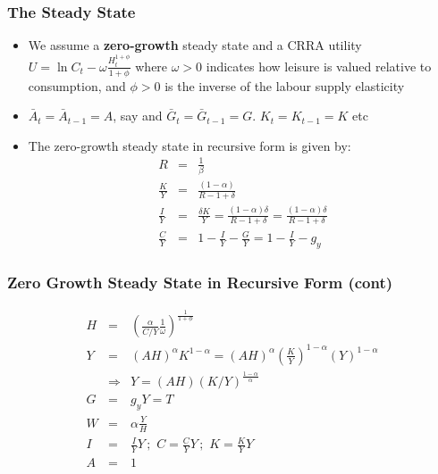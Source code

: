 \documentclass[xcolor=dvipsnames,handout,aspectratio=169]{beamer}
\begin{document}
\begin{frame}
 \frametitle{\textbf{The Steady State}}
 \begin{itemize}
\item We assume a  \textbf{zero-growth} steady state and a CRRA utility $U = \ln C_t - \omega\frac{H_t^{1+\phi}}{1+\phi}$
where $\omega> 0$ indicates how leisure is valued relative to consumption,
and $\phi> 0$ is the inverse of the labour supply elasticity
\item  $\bar{A}_t=\bar{A}_{t-1}=A$, say and $\bar{G}_t=\bar{G}_{t-1}=G$. $K_t=K_{t-1}=K$  etc
\item  The zero-growth  steady state in recursive form is given by:
\begin{eqnarray*}
R&=&\frac{1}{\beta}\\
\label{KY} \frac{K}{Y}&=&\frac{ (1-\alpha)}{R-1+\delta}  \\
\label{IY}
\frac{I}{Y}&=& \frac{\delta K}{Y}=\frac{ (1-\alpha)\delta}{R-1+\delta} =\frac{ (1-\alpha)\delta}{R-1+\delta}\\
\label{CY}  \frac{C}{Y}&=& 1-\frac{I}{Y}-\frac{G}{Y}=1-\frac{I}{Y}-g_y
\end{eqnarray*}
 \end{itemize}
\end{frame}

 \begin{frame}
  \frametitle{\textbf{Zero Growth Steady State in Recursive Form (cont) }}
 \begin{eqnarray*}
     H &=& \left(\frac{\alpha}{C/Y}\frac{1}{\omega}\right)^{\frac{1}{1+\phi}}\\
        Y&=&   (A H)^{\alpha} K^{1-\alpha}= (A H)^{ \alpha} \left(\frac{K}{Y}\right)^{1-\alpha} (Y)^{1-\alpha} \\  &\Rightarrow& Y= (A H) (K/Y)^\frac{{1-\alpha}}{\alpha}\\
               G&=&g_y Y=T \\
   W&=& \alpha  \frac{Y}{H} \\
   I&=& \frac{I}{Y} Y\, ;\,\, C= \frac{C}{Y} Y\,;\,\,  K= \frac{K}{Y} Y \\
   A&=& 1
\end{eqnarray*}
\end{frame}
\end{document}
